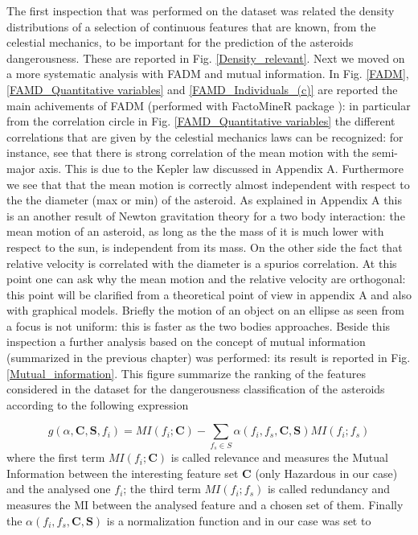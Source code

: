 \documentclass[12pt,%
               a4paper,%
               oneside,openany,%
               titlepage,%
               headinclude,footinclude,%
               BCOR5mm,%
               cleardoublepage=empty,%
               tablecaptionabove,%
               floatperchapter,
               ]{scrreprt}                 %
\begin{document}
The first inspection that was performed on the dataset was related the density distributions of a selection of continuous features that are known, from the celestial mechanics, to be important for the prediction of the asteroids dangerousness. These are reported in Fig. \ref{Density_relevant}. Next we moved on a more systematic analysis with FADM and mutual information. In Fig. \ref{FADM},\ref{FAMD_Quantitative variables} and \ref{FAMD_Individuals_(c)} are reported the main achivements of FADM (performed with FactoMineR package \cite{le2008factominer}): in particular from the correlation circle in Fig. \ref{FAMD_Quantitative variables} the different correlations that are given by the celestial mechanics laws can be recognized: for instance, see that there is strong correlation of the mean motion with the semi-major axis. This is due to the Kepler law discussed in Appendix A. Furthermore we see that that the mean motion is correctly almost independent with respect to the the diameter (max or min) of  the asteroid. As explained in Appendix A this is an another result of Newton gravitation theory for a two body interaction: the mean motion of an asteroid, as long as the the mass of it is much lower with respect to the sun, is independent from its mass. On the other side the fact that relative velocity is correlated with the diameter is a spurios correlation. At this point one can ask why the mean motion and the relative velocity are orthogonal: this point will be clarified from a theoretical point of view in appendix A and also with graphical models. Briefly the motion of an object on an ellipse as seen from a focus is not uniform: this is faster as the two bodies approaches. Beside this inspection a further analysis based on the concept of mutual information (summarized in the previous chapter) was performed: its result is reported in Fig. \ref{Mutual_information}. This figure summarize the ranking of the features considered in the dataset for the dangerousness classification of the asteroids according to the following expression \cite{kratzer2018varrank}

\begin{equation}
g(\alpha,\textbf{C},\textbf{S},f_{i})=MI(f_{i};\textbf{C})-\sum_{f_{s}\in S}\alpha(f_{i},f_{s},\textbf{C},\textbf{S})MI(f_{i};f_{s})
\end{equation}
where the first term $MI(f_{i};\textbf{C})$ is called relevance and measures the Mutual Information between the interesting feature set $\textbf{C}$ (only Hazardous in our case) and the analysed one $f_{i}$; the third term $MI(f_{i};f_{s})$ is called redundancy and measures the MI between the analysed feature and a chosen set of them. Finally the $\alpha(f_{i},f_{s},\textbf{C},\textbf{S})$ is a normalization function and in our case was set to \cite{kratzer2018varrank}
\end{document}
